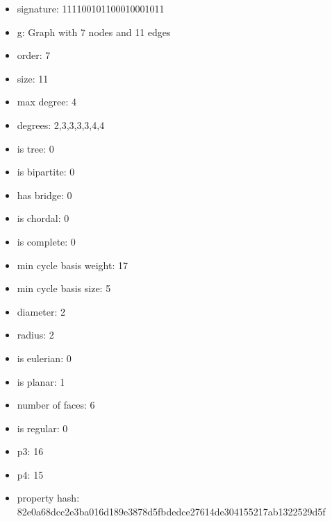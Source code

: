 \begin{itemize}
\item signature: 111100101100010001011
\item g: Graph with 7 nodes and 11 edges
\item order: 7
\item size: 11
\item max degree: 4
\item degrees: 2,3,3,3,3,4,4
\item is tree: 0
\item is bipartite: 0
\item has bridge: 0
\item is chordal: 0
\item is complete: 0
\item min cycle basis weight: 17
\item min cycle basis size: 5
\item diameter: 2
\item radius: 2
\item is eulerian: 0
\item is planar: 1
\item number of faces: 6
\item is regular: 0
\item p3: 16
\item p4: 15
\item property hash: 82e0a68dcc2e3ba016d189e3878d5fbdedce27614de304155217ab1322529d5f
\end{itemize}
\newpage
\begin{figure}
\end{figure}
